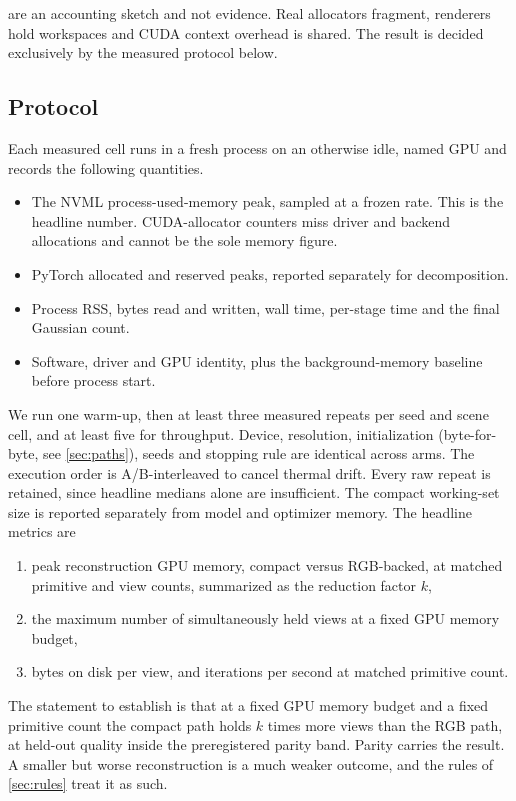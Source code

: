  are an accounting sketch and not evidence.  Real
allocators fragment, renderers hold workspaces and CUDA context overhead is shared.  The
result is decided exclusively by the measured protocol below.

\subsection{Protocol}
\label{sec:protocol}

Each measured cell runs in a fresh process on an otherwise idle, named GPU and records the
following quantities.
\begin{itemize}[leftmargin=1.6em,itemsep=1pt]
  \item The NVML process-used-memory peak, sampled at a frozen rate.  This is the headline
        number.  CUDA-allocator counters miss driver and backend allocations and cannot be
        the sole memory figure.
  \item PyTorch allocated and reserved peaks, reported separately for decomposition.
  \item Process RSS, bytes read and written, wall time, per-stage time and the final
        Gaussian count.
  \item Software, driver and GPU identity, plus the background-memory baseline before
        process start.
\end{itemize}
We run one warm-up, then at least three measured repeats per seed and scene cell, and at
least five for throughput.  Device, resolution, initialization (byte-for-byte, see
\cref{sec:paths}), seeds and stopping rule are identical across arms.  The execution order
is A/B-interleaved to cancel thermal drift.  Every raw repeat is retained, since headline
medians alone are insufficient.  The compact working-set size is reported separately from
model and optimizer memory.  The headline metrics are
\begin{enumerate}[leftmargin=1.6em,itemsep=1pt]
  \item peak reconstruction GPU memory, compact versus RGB-backed, at matched primitive
        and view counts, summarized as the reduction factor $k$,
  \item the maximum number of simultaneously held views at a fixed GPU memory budget,
  \item bytes on disk per view, and iterations per second at matched primitive count.
\end{enumerate}
The statement to establish is that at a fixed GPU memory budget and a fixed primitive
count the compact path holds $k$ times more views than the RGB path, at held-out quality
inside the preregistered parity band.  Parity carries the result.  A smaller but worse
reconstruction is a much weaker outcome, and the rules of \cref{sec:rules} treat it as
such.


